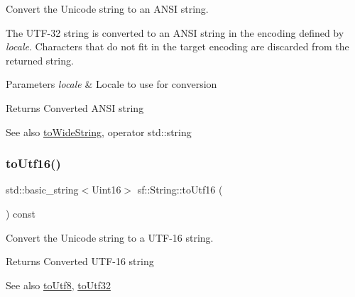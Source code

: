 Convert the Unicode string to an A\+N\+SI string. 

The U\+T\+F-\/32 string is converted to an A\+N\+SI string in the encoding defined by {\itshape locale}. Characters that do not fit in the target encoding are discarded from the returned string.


\begin{DoxyParams}{Parameters}
{\em locale} & Locale to use for conversion\\
\hline
\end{DoxyParams}
\begin{DoxyReturn}{Returns}
Converted A\+N\+SI string
\end{DoxyReturn}
\begin{DoxySeeAlso}{See also}
\mbox{\hyperlink{classsf_1_1_string_a9d81aa3103e7e2062bd85d912a5aecf1}{to\+Wide\+String}}, operator std\+::string \begin{DoxyVerb}\end{DoxyVerb}
 
\end{DoxySeeAlso}
\mbox{\label{classsf_1_1_string_a476374646d92143c0efcae8ac1fbe4ce}} 
\subsubsection{\texorpdfstring{toUtf16()}{toUtf16()}}
{\footnotesize\ttfamily std\+::basic\+\_\+string$<$Uint16$>$ sf\+::\+String\+::to\+Utf16 (\begin{DoxyParamCaption}{ }\end{DoxyParamCaption}) const}



Convert the Unicode string to a U\+T\+F-\/16 string. 

\begin{DoxyReturn}{Returns}
Converted U\+T\+F-\/16 string
\end{DoxyReturn}
\begin{DoxySeeAlso}{See also}
\mbox{\hyperlink{classsf_1_1_string_a9e12e9c568994e6df06962cf49180699}{to\+Utf8}}, \mbox{\hyperlink{classsf_1_1_string_af1f2a3c069ce9e53fe901065cff41f68}{to\+Utf32}} \begin{DoxyVerb}\end{DoxyVerb}
 
\end{DoxySeeAlso}
\mbox{\label{classsf_1_1_string_af1f2a3c069ce9e53fe901065cff41f68}} 
